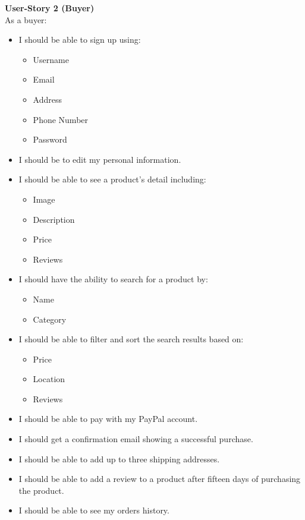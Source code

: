 \documentclass[11pt]{article}
\begin{document}
\textbf{User-Story 2 (Buyer)} \\
As a buyer:
\begin{itemize}
    \item I should be able to sign up using:
        \begin{itemize}
            \item Username
            \item Email
            \item Address
            \item Phone Number
            \item Password
        \end{itemize}
    \item I should be to edit my personal information.
    \item I should be able to see a product's detail including:
        \begin{itemize}
            \item Image
            \item Description
            \item Price
            \item Reviews
        \end{itemize}
    \item I should have the ability to search for a product by:
        \begin{itemize}
            \item Name
            \item Category
        \end{itemize}
    \item I should be able to filter and sort the search results based on:
        \begin{itemize}
            \item Price
            \item Location
            \item Reviews
        \end{itemize}
    \item I should be able to pay with my PayPal account.
    \item I should get a confirmation email showing a successful purchase.
    \item I should be able to add up to three shipping addresses.
    \item I should be able to add a review to a product after fifteen days of purchasing the product.
    \item I should be able to see my orders history.

\end{itemize}
\end{document}
